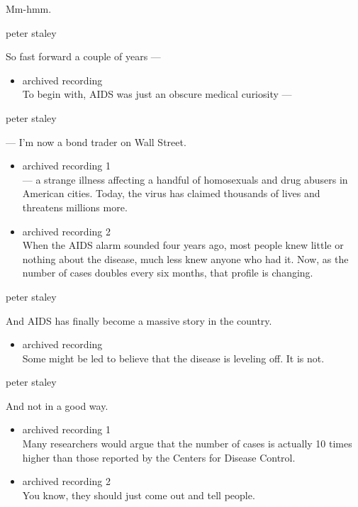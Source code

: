 Mm-hmm.

peter staley

So fast forward a couple of years ---

\begin{itemize}
\tightlist
\item
  archived recording\\
  To begin with, AIDS was just an obscure medical curiosity ---
\end{itemize}

peter staley

--- I'm now a bond trader on Wall Street.

\begin{itemize}
\item
  archived recording 1\\
  --- a strange illness affecting a handful of homosexuals and drug
  abusers in American cities. Today, the virus has claimed thousands of
  lives and threatens millions more.
\item
  archived recording 2\\
  When the AIDS alarm sounded four years ago, most people knew little or
  nothing about the disease, much less knew anyone who had it. Now, as
  the number of cases doubles every six months, that profile is
  changing.
\end{itemize}

peter staley

And AIDS has finally become a massive story in the country.

\begin{itemize}
\tightlist
\item
  archived recording\\
  Some might be led to believe that the disease is leveling off. It is
  not.
\end{itemize}

peter staley

And not in a good way.

\begin{itemize}
\item
  archived recording 1\\
  Many researchers would argue that the number of cases is actually 10
  times higher than those reported by the Centers for Disease Control.
\item
  archived recording 2\\
  You know, they should just come out and tell people.
\end{itemize}


